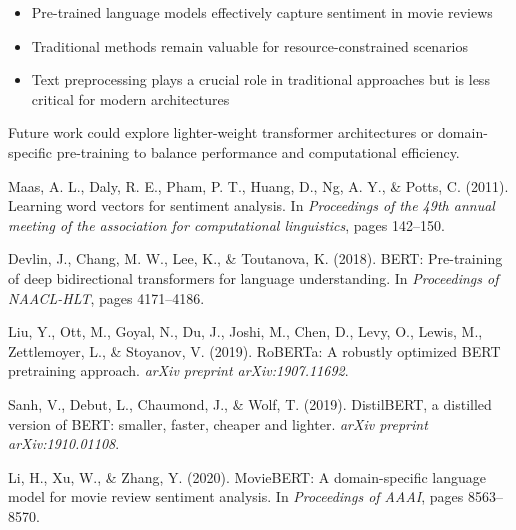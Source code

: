 \documentclass[numbers,nonatbib]{article}
\begin{document}
\begin{itemize}
    \item Pre-trained language models effectively capture sentiment in movie reviews
    \item Traditional methods remain valuable for resource-constrained scenarios
    \item Text preprocessing plays a crucial role in traditional approaches but is less critical for modern architectures
\end{itemize}

Future work could explore lighter-weight transformer architectures or domain-specific pre-training to balance performance and computational efficiency.


\begin{thebibliography}{9}
Maas, A. L., Daly, R. E., Pham, P. T., Huang, D., Ng, A. Y., \& Potts, C. (2011).
\newblock Learning word vectors for sentiment analysis.
\newblock In \textit{Proceedings of the 49th annual meeting of the association for computational linguistics}, pages 142--150.

Devlin, J., Chang, M. W., Lee, K., \& Toutanova, K. (2018).
\newblock BERT: Pre-training of deep bidirectional transformers for language understanding.
\newblock In \textit{Proceedings of NAACL-HLT}, pages 4171--4186.

Liu, Y., Ott, M., Goyal, N., Du, J., Joshi, M., Chen, D., Levy, O., Lewis, M., Zettlemoyer, L., \& Stoyanov, V. (2019).
\newblock RoBERTa: A robustly optimized BERT pretraining approach.
\newblock \textit{arXiv preprint arXiv:1907.11692}.

Sanh, V., Debut, L., Chaumond, J., \& Wolf, T. (2019).
\newblock DistilBERT, a distilled version of BERT: smaller, faster, cheaper and lighter.
\newblock \textit{arXiv preprint arXiv:1910.01108}.

Li, H., Xu, W., \& Zhang, Y. (2020).
\newblock MovieBERT: A domain-specific language model for movie review sentiment analysis.
\newblock In \textit{Proceedings of AAAI}, pages 8563--8570.
\end{thebibliography}
\end{document}
